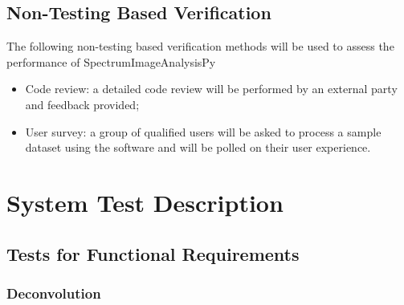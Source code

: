 \documentclass[12pt, titlepage]{article}
\newcommand{\progname}{SpectrumImageAnalysisPy}
\begin{document}
\subsection{Non-Testing Based Verification}

The following non-testing based verification methods will be used to assess the performance of \progname{}

\begin{itemize}
	\item Code review: a detailed code review will be performed by an external party and feedback provided;
	\item User survey: a group of qualified users will be asked to process a sample dataset using the software and will be polled on their user experience.
\end{itemize}


\section{System Test Description}
\label{sec:SysTest}
	
\subsection{Tests for Functional Requirements}
\label{subsec:FuncReqTest}

\subsubsection{Deconvolution}
		
\paragraph{}
\end{document}

